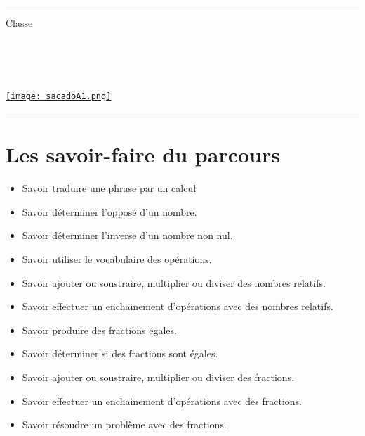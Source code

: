 \documentclass[a4paper,dvipsnames]{article}
\begin{document}

\fancyhead[C]{}
\hrule\medskip %
\begin{minipage}{0.295\textwidth} 
\raggedright
Classe \myClasse \hfill\\
\myDiscipline \hfill\\
\myParcours \hfill\\
\end{minipage}
\begin{minipage}{0.4\textwidth} 
\centering 
\scshape\huge
\textcolor{sacado_purple}{\myTitle} \\ 
\normalsize 
\end{minipage}
\begin{minipage}{0.295\textwidth} 
\raggedleft
\href{https://sacado.xyz/}{\texttt{[image: sacadoA1.png]}}
\end{minipage}
\medskip \hrule
\bigskip


%

\section{Les savoir-faire du parcours}

\begin{CpsCol}
\begin{itemize}
\item Savoir traduire une phrase par un calcul
\item Savoir déterminer l'opposé d'un nombre. 
\item Savoir déterminer l'inverse d'un nombre non nul. 
\item Savoir utiliser le vocabulaire des opérations.
\item Savoir ajouter ou soustraire, multiplier ou diviser des nombres relatifs.
\item Savoir effectuer un enchainement d'opérations avec des nombres relatifs.
\item Savoir produire des fractions égales.
\item Savoir déterminer si des fractions sont égales.         
\item Savoir ajouter ou soustraire, multiplier ou diviser des fractions.
\item Savoir effectuer un enchainement d'opérations avec des fractions.
\item Savoir résoudre un problème avec des fractions.
\end{itemize}
\end{CpsCol}
\end{document}
